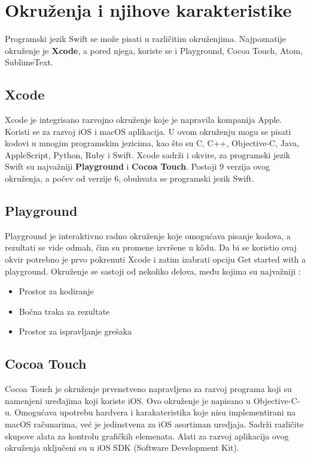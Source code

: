 \documentclass[a4paper]{article}
\begin{document}
\section{Okruženja i njihove karakteristike}	
\label{sec:petiDeo}
Programski jezik Swift se može pisati u različitim okruženjima. Najpoznatije okruženje je \textbf{Xcode}, a pored njega, koriste se i Playground, Cocoa Touch, Atom, SublimeText.

\subsection{Xcode}
\label{subsec:podnaslovXcode}
Xcode  je integrisano razvojno okruženje koje je napravila kompanija Apple. Koristi se za razvoj iOS i macOS aplikacija. U ovom okruženju mogu se pisati kodovi u mnogim programskim jezicima, kao što su C, C++, Objective-C, Java, AppleScript, Python, Ruby i Swift. Xcode sadrži i okvire, za programski jezik Swift su najvažniji \textbf{Playground} i \textbf{Cocoa Touch}. 
Postoji 9 verzija ovog okruženja, a počev od verzije 6, obuhvata se programski jezik Swift.

\subsection{Playground}
\label{subsec:podnaslovPlayground}
Playground je interaktivno radno okruženje koje omogućava pisanje kodova, a rezultati se vide odmah, čim su promene izvršene u k\^{o}du. Da bi se koristio ovaj okvir potrebno je prvo pokrenuti Xcode i zatim izabrati opciju Get started with a playground. Okruženje se sastoji od nekoliko delova, među kojima su najvažniji \cite{mastering_swift3}:
 
\begin{itemize}
\item Prostor za kodiranje
\item Bočna traka za rezultate
\item Prostor za ispravljanje grešaka
\end{itemize}

\subsection{Cocoa Touch}
\label{subsec:podnaslovCocoaTouch}
Cocoa Touch je okruženje prvenstveno napravljeno za razvoj programa
koji su namenjeni uređajima koji koriste iOS. Ovo okruženje je napisano u Objective-C-u. Omogućava upotrebu hardvera i karakateristika koje nisu implementirani na macOS računarima, već je jedinstvena za iOS asortiman uredjaja. Sadrži različite skupove alata za kontrolu grafičkih elemenata. Alati za razvoj aplikacija ovog okruženja uključeni su u iOS SDK (Software Development Kit).
\end{document}
